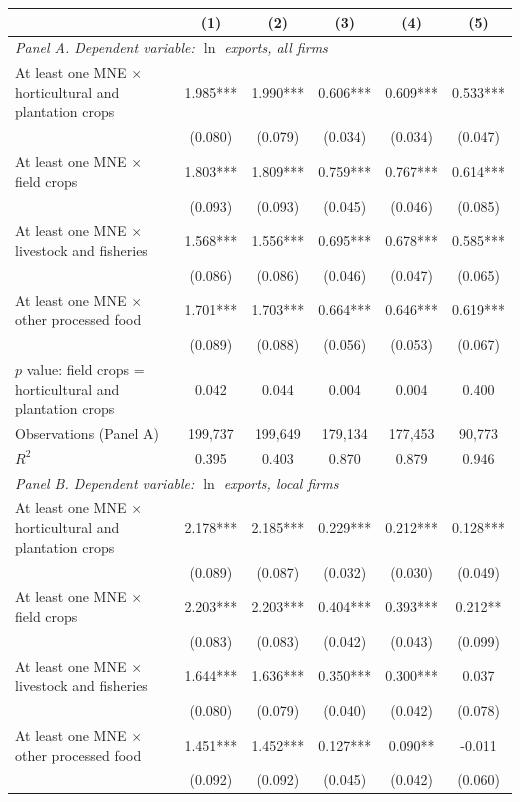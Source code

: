 \begin{tabular}{l*{5}{c}}
\toprule
 & (1) & (2) & (3) & (4) & (5) \\
\midrule
\multicolumn{6}{l}{\textit{Panel A. Dependent variable: $\ln$ exports, all firms}} \\
At least one MNE $\times$ horticultural and plantation crops & 1.985*** & 1.990*** & 0.606*** & 0.609*** & 0.533*** \\
 & (0.080) & (0.079) & (0.034) & (0.034) & (0.047) \\
At least one MNE $\times$ field crops & 1.803*** & 1.809*** & 0.759*** & 0.767*** & 0.614*** \\
 & (0.093) & (0.093) & (0.045) & (0.046) & (0.085) \\
At least one MNE $\times$ livestock and fisheries & 1.568*** & 1.556*** & 0.695*** & 0.678*** & 0.585*** \\
 & (0.086) & (0.086) & (0.046) & (0.047) & (0.065) \\
At least one MNE $\times$ other processed food & 1.701*** & 1.703*** & 0.664*** & 0.646*** & 0.619*** \\
 & (0.089) & (0.088) & (0.056) & (0.053) & (0.067) \\
$p$ value: field crops = horticultural and plantation crops & 0.042 & 0.044 & 0.004 & 0.004 & 0.400 \\
Observations (Panel A) & 199,737 & 199,649 & 179,134 & 177,453 & 90,773 \\
$R^2$ & 0.395 & 0.403 & 0.870 & 0.879 & 0.946 \\
\midrule
\multicolumn{6}{l}{\textit{Panel B. Dependent variable: $\ln$ exports, local firms}} \\
At least one MNE $\times$ horticultural and plantation crops & 2.178*** & 2.185*** & 0.229*** & 0.212*** & 0.128*** \\
 & (0.089) & (0.087) & (0.032) & (0.030) & (0.049) \\
At least one MNE $\times$ field crops & 2.203*** & 2.203*** & 0.404*** & 0.393*** & 0.212** \\
 & (0.083) & (0.083) & (0.042) & (0.043) & (0.099) \\
At least one MNE $\times$ livestock and fisheries & 1.644*** & 1.636*** & 0.350*** & 0.300*** & 0.037 \\
 & (0.080) & (0.079) & (0.040) & (0.042) & (0.078) \\
At least one MNE $\times$ other processed food & 1.451*** & 1.452*** & 0.127*** & 0.090** & -0.011 \\
 & (0.092) & (0.092) & (0.045) & (0.042) & (0.060) \\

\end{tabular}
